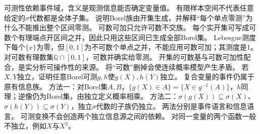 {可测性依赖事件域，含义是观测信息能否确定变量值。}
{有限样本空间不代表任意给定的$\sigma$代数都是全体子集。}
{说明Borel族由开集生成，并解释“每个单点零测”为什么不能推出整个区间零测。}
{可数可加只允许可数不交族。}
{每个实开集可写成可数个有理端点开区间之并，因此只用这些区间已生成全部Borel集。
Lebesgue测度下每个$\{x\}$为零，但$[0,1]$为不可数个单点之并，不能应用可数可加；其测度是1。
对可数有理数集$\mathbb Q\cap[0,1]$，可数并确实给零测。}
{开集的可数基与可数可加性配合，是实分析可操作性的来源。}
{将“可数”删掉会使连续概率模型产生矛盾。}
{若$X,Y$独立，证明任意Borel可测$g,h$使$g(X),h(Y)$独立。}
{复合变量的事件仍属于原有信息族。}
{方法一：对Borel集$A,B$，$\{g(X)\in A\}=\{X\in g^{-1}(A)\}$，$h$同理；逆像仍为Borel集，由独立定义概率相乘。
方法二：$\sigma(g(X))\subseteq\sigma(X)$、$\sigma(h(Y))\subseteq\sigma(Y)$，独立$\sigma$代数的子族仍独立。
两法分别是事件语言和信息语言。}
{可测变换不会创造两个独立信息源之间的依赖。}
{对同一变量的两个函数一般不独立，例如$X$与$X^2$。}

